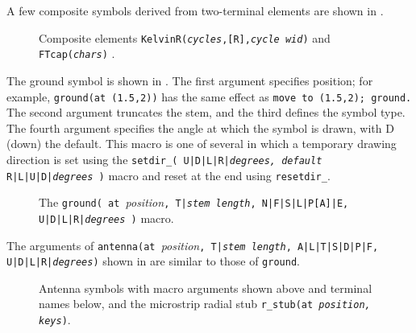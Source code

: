 A few composite symbols derived from two-terminal elements
are shown in .
\begin{figure}[H]
   \vspace*{-0.5ex}
   
   \vspace*{-0.5ex}
   \caption{Composite elements {\tt KelvinR({\sl cycles},[R],{\sl cycle wid})}
      and {\tt FTcap({\sl chars})} .}
   \label{Composite}
   \end{figure}

\enlargethispage{\baselineskip}
The ground symbol is shown in .
The first argument specifies position; for example,
{\tt ground(at (1.5,2))} has the same effect as
{\tt move to (1.5,2); ground.}
The second argument truncates
the stem, and the third defines the symbol type.
The fourth argument specifies the angle at which the symbol is drawn,
with D (down) the default.
This macro is one of several in which a temporary drawing direction
is set using the
 {\tt setdir\_( U|D|L|R|{\sl degrees, default} R|L|U|D|{\sl degrees} )}
macro and reset at the end using {\tt resetdir\_}.
\begin{figure}[H]
   
   \caption{The 
     {\tt ground( at }{\sl position}{\tt,
       T|{\sl stem length}, N|F|S|L|P[A]|E, U|D|L|R|{\sl degrees} )}
     macro.}
   \label{Grounds}
   \end{figure}

The arguments of
{\tt antenna(at }{\sl position}{\tt,
  T|{\sl stem length}, A|L|T|S|D|P|F, U|D|L|R|{\sl degrees})}
shown in  are similar to those of {\tt ground}.
\begin{figure}[H]
   
   \caption{Antenna symbols with macro arguments shown above and
     terminal names below, and the microstrip radial stub
     {\tt r\_stub(at {\sl position, keys})}. }
   \label{Antennas}
   \end{figure}

